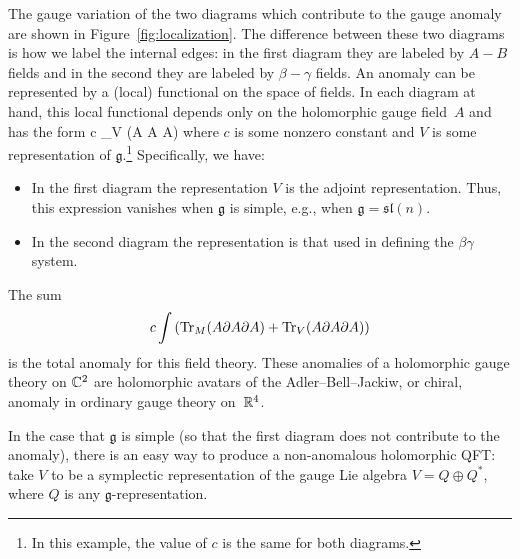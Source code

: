 \documentclass[11pt]{amsart}
\renewcommand{\op}{\operatorname}
\def\lie#1{\ensuremath{\mathfrak{#1}}}
\begin{document}
The gauge variation of the two diagrams which contribute to the gauge anomaly are shown in Figure~\ref{fig:localization}.
The difference between these two diagrams is how we label the internal edges: in the first diagram they are labeled by $A-B$ fields and in the second they are labeled by $\beta-\gamma$ fields.
An anomaly can be represented by a (local) functional on the space of fields.
In each diagram at hand, this local functional depends only on the holomorphic gauge field~$A$ and has the form
\beqn
c \int \op{Tr}_V (A \wedge \del A \wedge \del A)
\eeqn
where $c$ is some nonzero constant and $V$ is some representation of $\lie{g}$.\footnote{In this example, the value of $c$ is the same for both diagrams.}
Specifically, we have:
\begin{itemize}
\item In the first diagram the representation $V$ is the adjoint representation. 
Thus, this expression vanishes when $\lie{g}$ is simple, e.g., when $\lie{g} = \lie{sl}(n)$.
\item In the second diagram the representation is that used in defining the $\beta\gamma$ system.
\end{itemize}
The sum 
\[
c \int \left(\op{Tr}_M (A \del A \del A) + \op{Tr}_V(A \del A \del A)\right)
\]
is the total anomaly for this field theory.
These anomalies of a holomorphic gauge theory on $\mathbb C^2$ are holomorphic avatars of the Adler--Bell--Jackiw, or chiral, anomaly in ordinary gauge theory on~$\mathbb R^4$.

In the case that $\lie{g}$ is simple (so that the first diagram does not contribute to the anomaly), 
there is an easy way to produce a non-anomalous holomorphic QFT: 
take $V$ to be a symplectic representation of the gauge Lie algebra $V = Q \oplus Q^*$, where $Q$ is any $\lie{g}$-representation.
\end{document}
